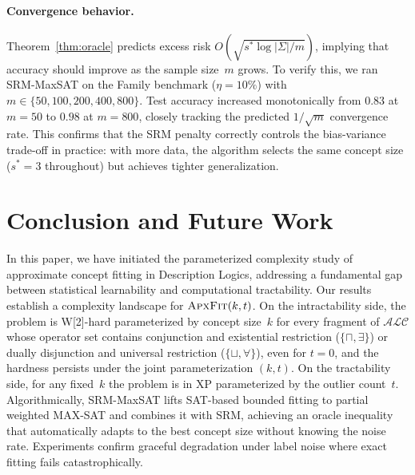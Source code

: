 \documentclass[accepted]{uai2026} %
\theoremstyle{definition}
\theoremstyle{remark}
\newcommand{\AF}{\textsc{ApxFit}}
\begin{document}
\paragraph{Convergence behavior.}
Theorem~\ref{thm:oracle} predicts excess risk
$O(\sqrt{s^*\log|\Sigma|/m})$, implying that accuracy should
improve as the sample size~$m$ grows. To verify this, we
ran SRM-MaxSAT on the Family benchmark ($\eta = 10\%$) with
$m \in \{50, 100, 200, 400, 800\}$. Test
accuracy increased monotonically from $0.83$ at $m = 50$ to
$0.98$ at $m = 800$, closely tracking the
predicted $1/\sqrt{m}$ convergence rate. This confirms that the
SRM penalty correctly controls the bias-variance trade-off in
practice: with more data, the algorithm selects the same concept
size ($s^* = 3$ throughout) but achieves tighter generalization.

\section{Conclusion and Future Work}\label{sec:conclusion}

In this paper, we have initiated the parameterized complexity study
of approximate concept fitting in Description Logics, addressing
a fundamental gap between statistical learnability and
computational tractability. Our results establish a complexity landscape
for $\AF(k,t)$.  On the intractability side, the problem is
W[2]-hard parameterized by concept size~$k$ for every fragment of
$\mathcal{ALC}$ whose operator set contains
conjunction and existential restriction
($\{\sqcap, \exists\}$) or dually disjunction and universal
restriction ($\{\sqcup, \forall\}$), even
for $t = 0$, and the hardness persists under the
joint parameterization $(k,t)$.
On the tractability side, for any fixed~$k$ the problem is in XP
parameterized by the outlier count~$t$.  Algorithmically, SRM-MaxSAT
lifts SAT-based bounded fitting to
partial weighted MAX-SAT and combines it with
SRM, achieving an oracle inequality that automatically adapts to
the best concept size without knowing the noise rate.
Experiments confirm graceful
degradation under label noise where exact fitting fails
catastrophically.
\end{document}
